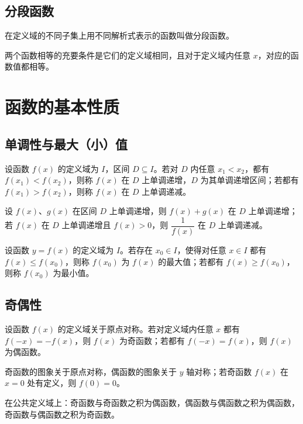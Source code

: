 \subsection{分段函数}
\begin{definition}[分段函数]
在定义域的不同子集上用不同解析式表示的函数叫做分段函数。
\end{definition}
\begin{axiom}[函数相等的判定]
两个函数相等的充要条件是它们的定义域相同，且对于定义域内任意 $x$，对应的函数值都相等。
\end{axiom}

\section{函数的基本性质}
\subsection{单调性与最大（小）值}
\begin{definition}[增函数与减函数]
设函数 $f(x)$ 的定义域为 $I$，区间 $D \subseteq I$。若对 $D$ 内任意 $x_1<x_2$，都有 $f(x_1)<f(x_2)$，则称 $f(x)$ 在 $D$ 上单调递增，$D$ 为其单调递增区间；若都有 $f(x_1)>f(x_2)$，则称 $f(x)$ 在 $D$ 上单调递减。
\end{definition}
\begin{theorem}[单调性的运算性质]
设 $f(x)$、$g(x)$ 在区间 $D$ 上单调递增，则 $f(x)+g(x)$ 在 $D$ 上单调递增；若 $f(x)$ 在 $D$ 上单调递增且 $f(x)>0$，则 $\dfrac{1}{f(x)}$ 在 $D$ 上单调递减。
\end{theorem}
\begin{definition}[最大值与最小值]
设函数 $y=f(x)$ 的定义域为 $I$。若存在 $x_0 \in I$，使得对任意 $x \in I$ 都有 $f(x) \leq f(x_0)$，则称 $f(x_0)$ 为 $f(x)$ 的最大值；若都有 $f(x) \geq f(x_0)$，则称 $f(x_0)$ 为最小值。
\end{definition}
\subsection{奇偶性}
\begin{definition}[奇函数与偶函数]
设函数 $f(x)$ 的定义域关于原点对称。若对定义域内任意 $x$ 都有 $f(-x)=-f(x)$，则 $f(x)$ 为奇函数；若都有 $f(-x)=f(x)$，则 $f(x)$ 为偶函数。
\end{definition}
\begin{theorem}[奇偶函数的图象特征]
奇函数的图象关于原点对称，偶函数的图象关于 $y$ 轴对称；若奇函数 $f(x)$ 在 $x=0$ 处有定义，则 $f(0)=0$。
\end{theorem}
\begin{corollary}[奇偶性的运算]
在公共定义域上：奇函数与奇函数之积为偶函数，偶函数与偶函数之积为偶函数，奇函数与偶函数之积为奇函数。
\end{corollary}
